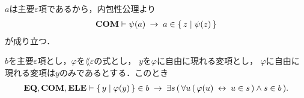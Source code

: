	\begin{sketch}
		$a$は主要$\varepsilon$項であるから，内包性公理より
		\begin{align}
			\mbox{\bf COM} \vdash \psi(a) \hspace{0.25em}\rightarrow\hspace{0.25em} a \in \left\{\, z \mid \psi(z)\, \right\}
		\end{align}
		が成り立つ．
		\QED
	\end{sketch}
	
	\begin{screen}
		\begin{thm}
		\label{thm:equivalent_formula_rewriting_9}
			$b$を主要$\varepsilon$項とし，$\varphi$を$\lang{\varepsilon}$の式とし，
			$y$を$\varphi$に自由に現れる変項とし，
			$\varphi$に自由に現れる変項は$y$のみであるとする．このとき
			\begin{align}
				\mbox{{\bf EQ}},\mbox{\bf COM},\mbox{{\bf ELE}} \vdash \left\{\, y \mid \varphi(y)\, \right\} \in b
				\hspace{0.25em}\rightarrow\hspace{0.25em} \exists s\, (\, 
				\forall u\, (\, \varphi(u) \hspace{0.25em}\leftrightarrow\hspace{0.25em} u \in s\, )
				\wedge s \in b\, ).
			\end{align}
		\end{thm}
	\end{screen}
	
